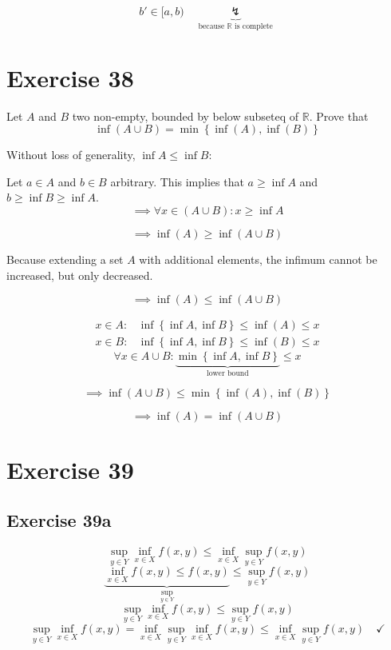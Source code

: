 \documentclass[a4paper]{article}
\theoremstyle{definition}
\newcommand\set[1]{\left\{#1\right\}}
\begin{document}
\[ b' \in [a,b) \quad\underbrace{\lightning}_{\text{because } \mathbb R \text{ is complete}} \]

\section{Exercise 38}

\begin{ex}
  Let $A$ and $B$ two non-empty, bounded by below subseteq of $\mathbb R$. Prove that
  \[ \inf(A \cup B) = \min\set{\inf(A), \inf(B)} \]
\end{ex}

Without loss of generality, $\inf{A} \leq \inf{B}$:

Let $a \in A$ and $b \in B$ arbitrary.
This implies that $a \geq \inf{A}$ and $b \geq \inf{B} \geq \inf{A}$.
\[ \implies \forall x \in (A \cup B): x \geq \inf{A} \]

\[ \implies \inf(A) \geq \inf(A \cup B) \]

Because extending a set $A$ with additional elements,
the infimum cannot be increased, but only decreased.

\[ \implies \inf(A) \leq \inf(A \cup B) \]

\begin{align*}
  x \in A: & \inf\set{\inf{A}, \inf{B}} \leq \inf(A) \leq x \\
  x \in B: & \inf\set{\inf{A}, \inf{B}} \leq \inf(B) \leq x
\end{align*}
\[ \forall x \in A \cup B: \underbrace{\min\set{\inf{A}, \inf{B}}}_{\text{lower bound}} \leq x \]

\[ \implies \inf(A \cup B) \leq \min\set{\inf(A), \inf(B)} \]

\[ \implies \inf(A) = \inf(A \cup B) \]

\section{Exercise 39}
\subsection{Exercise 39a}
\[ \sup_{y \in Y} \inf_{x \in X} f(x, y) \leq \inf_{x \in X} \sup_{y \in Y} f(x, y) \]
\[ \underbrace{\inf_{x \in X} f(x, y) \leq f(x, y)}_{\sup_{y \in Y}} \leq \sup_{y \in Y} f(x, y) \]
\[ \sup_{y \in Y} \inf_{x \in X} f(x, y) \leq \sup_{y \in Y} f(x, y) \]
\[ \sup_{y \in Y}{\inf_{x \in X} f(x, y)} = \inf_{x \in X} \sup_{y \in Y} \inf_{x \in X} f(x, y) \leq \inf_{x \in X} \sup_{y \in Y} f(x, y) \quad \checkmark \]
\end{document}
